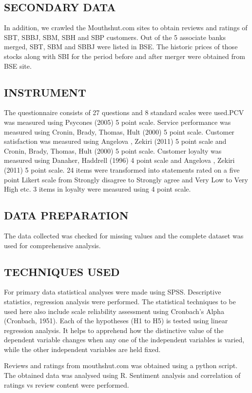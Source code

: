 \documentclass[a4paper, 12pt]{extarticle}
\begin{document}
{\subsection{SECONDARY DATA}
In addition, we crawled the Mouthshut.com sites to obtain reviews and ratings of SBT, SBBJ, SBM, SBH and SBP customers. Out of the 5 associate banks merged, SBT, SBM and SBBJ were listed in BSE. The historic prices of those stocks along with SBI for the period before and after merger were obtained from BSE site.

\subsection{INSTRUMENT}
The questionnaire consists of 27 questions and 8 standard scales were used.PCV was measured using Psycones (2005)  5 point scale. Service performance was measured using Cronin, Brady, Thomas, Hult (2000)  5 point scale. Customer satisfaction was measured using 
Angelova , Zekiri (2011)  5 point scale and Cronin, Brady, Thomas, Hult (2000)  5 point scale. Customer loyalty was measured using Danaher, Haddrell (1996) 4 point scale and Angelova , Zekiri (2011) 5 point scale. 24 items were transformed into statements rated on a five  point Likert scale from Strongly disagree to Strongly agree and Very Low to Very High etc. 3 items in loyalty were measured using 4 point scale.

\subsection{DATA PREPARATION}
The data collected was checked for missing values and the complete dataset was used for comprehensive analysis.

\subsection{TECHNIQUES USED}
For primary data statistical analyses were made using SPSS. Descriptive statistics, regression analysis were performed. The statistical techniques to be used here also include scale reliability assessment using Cronbach's Alpha (Cronbach, 1951). Each of the hypotheses (H1 to H5) is tested using linear regression analysis. It helps to apprehend how the distinctive value of the dependent variable changes when any one of the independent variables is varied, while the other independent variables are held fixed.

Reviews and ratings from mouthshut.com was obtained using a python script. The obtained data was analysed using R. Sentiment analysis and correlation of ratings vs review content were performed.
 

}
\end{document}
